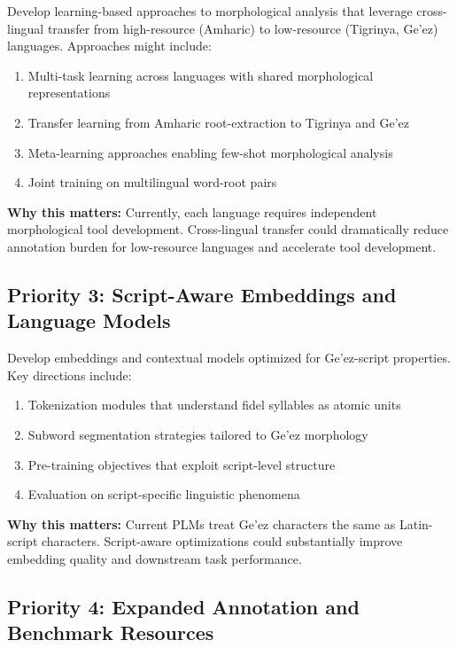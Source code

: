 \documentclass[12pt,a4paper]{article}
\theoremstyle{plain}
\theoremstyle{definition}
\begin{document}
Develop learning-based approaches to morphological analysis that leverage cross-lingual transfer from high-resource (Amharic) to low-resource (Tigrinya, Ge'ez) languages. Approaches might include:

\begin{enumerate}
\item Multi-task learning across languages with shared morphological representations
\item Transfer learning from Amharic root-extraction to Tigrinya and Ge'ez
\item Meta-learning approaches enabling few-shot morphological analysis
\item Joint training on multilingual word-root pairs
\end{enumerate}

\textbf{Why this matters:} Currently, each language requires independent morphological tool development. Cross-lingual transfer could dramatically reduce annotation burden for low-resource languages and accelerate tool development.

\subsection{Priority 3: Script-Aware Embeddings and Language Models}

Develop embeddings and contextual models optimized for Ge'ez-script properties. Key directions include:

\begin{enumerate}
\item Tokenization modules that understand fidel syllables as atomic units
\item Subword segmentation strategies tailored to Ge'ez morphology
\item Pre-training objectives that exploit script-level structure
\item Evaluation on script-specific linguistic phenomena
\end{enumerate}

\textbf{Why this matters:} Current PLMs treat Ge'ez characters the same as Latin-script characters. Script-aware optimizations could substantially improve embedding quality and downstream task performance.

\subsection{Priority 4: Expanded Annotation and Benchmark Resources}
\end{document}
